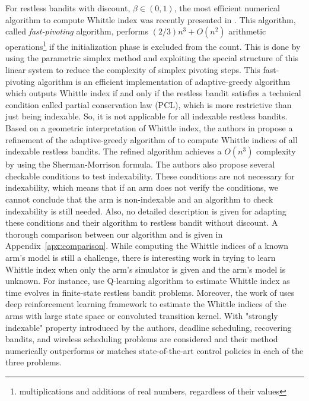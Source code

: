 \documentclass[acmsmall,screen,anonymous]{acmart}
\begin{document}
For restless bandits with discount, $\beta\in(0,1)$, the most efficient numerical algorithm to compute Whittle index was recently presented in \cite{nino2020fast}. This algorithm, called \emph{fast-pivoting} algorithm,  performs $(2/3)n^3+O(n^2)$ arithmetic operations\footnote{multiplications and additions of real numbers, regardless of their values} if the initialization phase is excluded from the count.
This is done by using the parametric simplex method and  exploiting the special structure of this linear system to  reduce the complexity of simplex pivoting steps. This fast-pivoting algorithm is an efficient implementation of adaptive-greedy algorithm \cite{nino2007dynamic} which outputs Whittle index if and only if the restless bandit satisfies a technical condition called partial conservation law (PCL), which is  more restrictive than just being indexable. So, it is not applicable for all indexable restless bandits.
Based on a geometric interpretation of Whittle index, the authors in \cite{akbarzadeh2020conditions} propose a refinement of the adaptive-greedy algorithm of \cite{nino2007dynamic} to compute Whittle indices of all indexable restless bandits. The refined algorithm achieves a  $O(n^3)$ complexity  by using the  Sherman-Morrison formula. The authors also propose several checkable conditions  to  test  indexability. These conditions are not necessary for indexability, which means that if an arm does not verify the conditions, we cannot conclude that the arm is non-indexable and an algorithm to check indexability is still needed. Also, no detailed description is given for adapting these conditions and their algorithm to restless bandit without discount. A thorough comparison between our algorithm and \cite{akbarzadeh2020conditions,nino2020fast} is given in Appendix~\ref{apx:comparison}. 
While computing the Whittle indices of a known arm's model is still a challenge, there is interesting work in trying to learn Whittle index when only the arm's simulator is given and the arm's model is unknown. For instance, \cite{avrachenkov2020whittle, fu2019towards} use Q-learning algorithm to estimate Whittle index as time evolves in finite-state restless bandit problems. Moreover,
the work of \cite{nakhleh2022neurwin} uses deep reinforcement learning framework to estimate the Whittle indices of the arms with large state space or convoluted transition kernel. With "strongly indexable" property introduced by the authors, deadline scheduling, recovering bandits, and wireless scheduling problems are considered and their method numerically outperforms or matches state-of-the-art control policies in each of the three problems.
\end{document}
